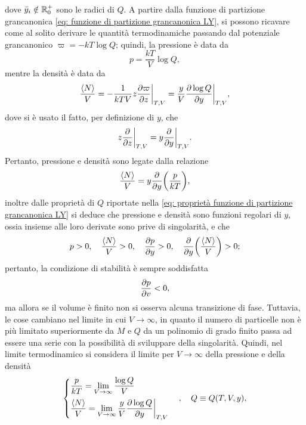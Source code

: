 dove $\bar{y}_i \notin \mathbb{R}^+_0$ sono le radici di $Q$. A partire dalla funzione di partizione grancanonica \eqref{eq: funzione di partizione grancanonica LY}, si possono ricavare come al solito derivare le quantità termodinamiche passando dal potenziale grancanonico $\varpi = -kT\log{Q}$; quindi, la pressione è data da
\begin{equation}
    p = \frac{kT}{V}\log{Q},
\end{equation}
mentre la densità è data da 
\begin{equation}
    \frac{\langle N \rangle}{V} = -\frac{1}{kTV}z\frac{\partial\varpi}{\partial z}\bigg|_{T,V} = \frac{y}{V}\frac{\partial\log{Q}}{\partial y}\bigg|_{T,V},
\end{equation}
dove si è usato il fatto, per definizione di $y$, che 
\begin{equation}
    z\frac{\partial}{\partial z}\bigg|_{T,V} = y\frac{\partial}{\partial y}\bigg|_{T,V}.
\end{equation}
Pertanto, pressione e densità sono legate dalla relazione 
\begin{equation}
    \frac{\langle N \rangle}{V} = y\frac{\partial}{\partial y}\bigg(\frac{p}{kT}\bigg),
\end{equation}
inoltre dalle proprietà di $Q$ riportate nella \eqref{eq: proprietà funzione di partizione grancanonica LY} si deduce che pressione e densità sono funzioni regolari di $y$, ossia insieme alle loro derivate sono prive di singolarità, e che
\begin{equation}
    p>0,\quad \frac{\langle N \rangle}{V} > 0, \quad \frac{\partial p}{\partial y} > 0,\quad \frac{\partial }{\partial y}\bigg(\frac{\langle N \rangle}{V}\bigg) > 0;
\end{equation}
pertanto, la condizione di stabilità è sempre soddisfatta 
\begin{equation}
\label{eq: condizione stabilità LY}
    \frac{\partial p}{\partial v} < 0,
\end{equation}
ma allora se il volume è finito non si osserva alcuna transizione di fase. Tuttavia, le cose cambiano nel limite in cui $V \to \infty$, in quanto il numero di particelle non è più limitato superiormente da $M$ e $Q$ da un polinomio di grado finito passa ad essere una serie con la possibilità di sviluppare della singolarità. Quindi, nel limite termodinamico si considera il limite per $V \to \infty$ della pressione e della densità 
\begin{equation}
    \begin{cases}
        \dfrac{p}{kT} = \displaystyle\lim_{V\to\infty}{\dfrac{\log{Q}}{V}} \\[2ex]
        \dfrac{\langle N \rangle}{V} = \displaystyle\lim_{V\to\infty}{\dfrac{y}{V}\dfrac{\partial\log{Q}}{\partial y}\bigg|_{T,V}}
    \end{cases},\quad Q \equiv Q(T,V,y),
\end{equation}
